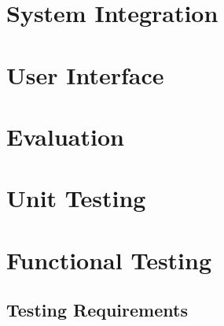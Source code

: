 \section{System Integration }
\section{User Interface}
\section{Evaluation}
\section{Unit Testing}
\section{Functional Testing}
\subsection{Testing Requirements}
